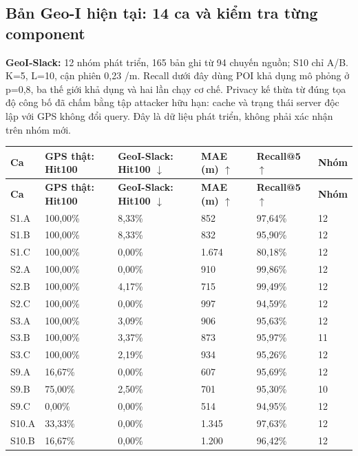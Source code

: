 \documentclass[10pt,a4paper]{article}
\begin{document}
\clearpage
\subsection{Bản Geo-I hiện tại: 14 ca và kiểm tra từng component}\label{sub:3.1}
\textbf{GeoI-Slack:} 12 nhóm phát triển, 165 bản ghi từ 94 chuyến nguồn; S10 chỉ A/B. K=5, L=10, cận phiên 0,23 /m. Recall dưới đây dùng POI khả dụng mô phỏng ở p=0,8, ba thế giới khả dụng và hai lần chạy cơ chế. Privacy kế thừa từ đúng tọa độ công bố đã chấm bằng tập attacker hữu hạn: cache và trạng thái server độc lập với GPS không đổi query. Đây là dữ liệu phát triển, không phải xác nhận trên nhóm mới.

\begingroup\small
\begin{longtable}{@{}P{1.589cm}P{2.980cm}P{3.477cm}P{2.980cm}P{3.179cm}P{1.589cm}@{}}
\toprule
\textbf{Ca} & \textbf{GPS thật: Hit100} & \textbf{GeoI-Slack: Hit100 $\downarrow$} & \textbf{MAE (m) $\uparrow$} & \textbf{Recall@5 $\uparrow$} & \textbf{Nhóm}\\\midrule
\endfirsthead
\toprule
\textbf{Ca} & \textbf{GPS thật: Hit100} & \textbf{GeoI-Slack: Hit100 $\downarrow$} & \textbf{MAE (m) $\uparrow$} & \textbf{Recall@5 $\uparrow$} & \textbf{Nhóm}\\\midrule
\endhead
\bottomrule\endfoot
S1.A & 100,00\% & 8,33\% & 852 & 97,64\% & 12\\
\addlinespace[3pt]
S1.B & 100,00\% & 8,33\% & 832 & 95,90\% & 12\\
\addlinespace[3pt]
S1.C & 100,00\% & 0,00\% & 1.674 & 80,18\% & 12\\
\addlinespace[3pt]
S2.A & 100,00\% & 0,00\% & 910 & 99,86\% & 12\\
\addlinespace[3pt]
S2.B & 100,00\% & 4,17\% & 715 & 99,49\% & 12\\
\addlinespace[3pt]
S2.C & 100,00\% & 0,00\% & 997 & 94,59\% & 12\\
\addlinespace[3pt]
S3.A & 100,00\% & 3,09\% & 906 & 95,63\% & 12\\
\addlinespace[3pt]
S3.B & 100,00\% & 3,37\% & 873 & 95,97\% & 11\\
\addlinespace[3pt]
S3.C & 100,00\% & 2,19\% & 934 & 95,26\% & 12\\
\addlinespace[3pt]
S9.A & 16,67\% & 0,00\% & 607 & 95,69\% & 12\\
\addlinespace[3pt]
S9.B & 75,00\% & 2,50\% & 701 & 95,30\% & 10\\
\addlinespace[3pt]
S9.C & 0,00\% & 0,00\% & 514 & 94,95\% & 12\\
\addlinespace[3pt]
S10.A & 33,33\% & 0,00\% & 1.345 & 97,63\% & 12\\
\addlinespace[3pt]
S10.B & 16,67\% & 0,00\% & 1.200 & 96,42\% & 12\\
\end{longtable}
\end{document}
